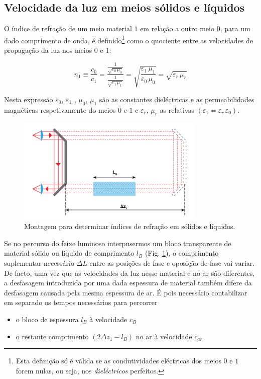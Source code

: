 \documentclass[12pt,a4paper,oneside]{paper}
\begin{document}
\subsection{\sf Velocidade da luz em meios sólidos e líquidos}
 O índice de refração de um meio material $1$ em relação a outro meio $0$, para um dado comprimento de onda, é
 definido\footnote{Esta definição só é válida se as condutividades eléctricas dos meios $0$ e $1$ forem nulas, ou seja,
 nos \emph{dieléctricos} perfeitos.}
 como o quociente entre as velocidades de propagação da luz nos meios $0$ e $1$:

 \begin{equation}
	\label{eq:index}
	n_1 \equiv \frac{c_0}{c_1}  = \frac{\frac{1}{\sqrt{\varepsilon_0 \, \mu_0}} }{\frac{1}{\sqrt{\varepsilon_1 \, \mu_1}} } =
		\sqrt{\frac{\varepsilon_1 \, \mu_1}{\varepsilon_0 \, \mu_0}} = \sqrt{\varepsilon_r \, \mu_r}
\end{equation}

Nesta expressão $\varepsilon_0$, $\varepsilon_1$ ,	 $\mu_0$, $\mu_1$ são as constantes dieléctricas e as permeabilidades
magnéticas respetivamente do meios $0$ e $1$ e $\varepsilon_r$, $\mu_r$    as relativas $(\varepsilon_1= \varepsilon_r\, \varepsilon_0)$.

\begin{figure}[H]  
	\centering 
	\includegraphics[width=0.8\textwidth]{./luz_images/esquema2.pdf}
	\caption{Montagem para determinar índices de refração em sólidos e líquidos. \label{fig:Montagem_bloco}} 
\end{figure}

Se no percurso do feixe luminoso interpusermos um bloco transparente de material sólido ou líquido de comprimento
$l_B$ (Fig. \ref{fig:Montagem_bloco}), o comprimento suplementar necessário $\Delta L$ entre as posições de fase e
oposição de fase vai variar. De facto, uma vez que as velocidades da luz nesse material e no ar são diferentes, a
desfasagem introduzida por uma dada espessura de material também difere da desfasagem causada pela mesma espessura de ar.
É pois necessário contabilizar em separado os tempos necessários para percorrer 
\begin{itemize}
\item o bloco de espessura $l_B$ à velocidade $c_B$
\item o restante comprimento $(2\Delta z_1-l_B)$ no ar à velocidade $c_{ar}$
\end{itemize}
\end{document}
